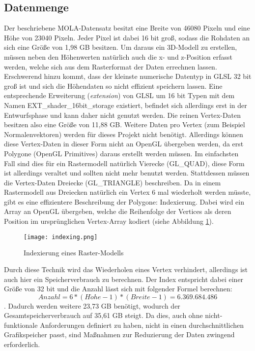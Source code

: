 \subsection{Datenmenge}\label{datenmenge}
Der beschriebene MOLA-Datensatz besitzt eine Breite von 46080 Pixeln und eine Höhe von 23040 Pixeln. Jeder Pixel ist dabei 16 bit groß, sodass die Rohdaten an sich eine Größe von 1,98 GB besitzen\cite{molaDataExtended}. Um daraus ein 3D-Modell zu erstellen, müssen neben den Höhenwerten natürlich auch die x- und z-Position erfasst werden, welche sich aus dem Rasterformat der Daten errechnen lassen. Erschwerend hinzu kommt, dass der kleinste numerische Datentyp in GLSL 32 bit groß ist\cite[Abschnitt 4.1, S. 23]{glslSpec} und sich die Höhendaten so nicht effizient speichern lassen. Eine entsprechende Erweiterung (\textit{extension}) von GLSL um 16 bit Typen mit dem Namen EXT\_shader\_16bit\_storage existiert, befindet sich allerdings erst in der Entwurfsphase und kann daher nicht genutzt werden. Die reinen Vertex-Daten besitzen also eine Größe von 11,88 GB. Weitere Daten pro Vertex (zum Beispiel Normalenvektoren) werden für dieses Projekt nicht benötigt. Allerdings können diese Vertex-Daten in dieser Form nicht an OpenGL übergeben werden, da erst Polygone (OpenGL Primitives) daraus erstellt werden müssen. Im einfachsten Fall sind dies für ein Rastermodell natürlich Vierecke (GL\_QUAD), diese Form ist allerdings veraltet und sollten nicht mehr benutzt werden. Stattdessen müssen die Vertex-Daten  Dreiecke (GL\_TRIANGLE) beschreiben. Da in einem Rastermodell aus Dreiecken natürlich ein Vertex 6 mal wiederholt werden müsste, gibt es eine effizientere Beschreibung der Polygone: Indexierung. Dabei wird ein Array an OpenGL übergeben, welche die Reihenfolge der Vertices als deren Position im ursprünglichen Vertex-Array kodiert (siehe Abbildung \ref{indexing}). 

\begin{figure}[H]
  \texttt{[image: indexing.png]}
  \caption{Indexierung eines Raster-Modells}
  \label{indexing}
\end{figure}

Durch diese Technik wird das Wiederholen eines Vertex verhindert, allerdings ist auch hier ein Speicherverbrauch zu berechnen. Der Index entspricht dabei einer Größe von 32 bit und die Anzahl lässt sich mit folgender Formel berechnen: \[Anzahl = 6 * (H\ddot{o}he - 1) * (Breite - 1) = 6.369.684.486\]. Dadurch werden weitere 23,73 GB benötigt, wodurch der Gesamtspeicherverbrauch auf 35,61 GB steigt. Da dies, auch ohne nicht-funktionale Anforderungen definiert zu haben, nicht in einen durchschnittlichen Grafikspeicher passt, sind Maßnahmen zur Reduzierung der Daten zwingend erforderlich.

